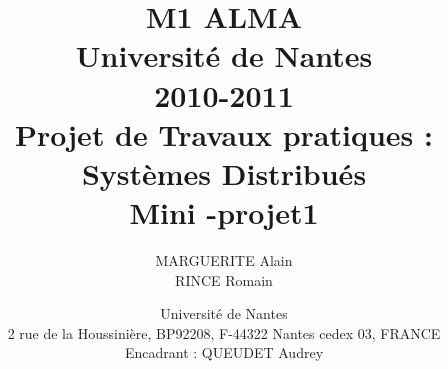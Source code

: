 \documentclass[12pt,a4paper,utf8x]{report}
\title
{
	\normalsize{ M1 ALMA\\ 
	Université de Nantes\\
	2010-2011}\\
	\vspace{15mm}
	\Huge{Projet de Travaux pratiques :\\Systèmes Distribués \\ Mini -projet1}
}
\author{MARGUERITE Alain\\ RINCE Romain
	\vspace{45mm}
}
\date
{	
	\normalsize{Université de Nantes \\ 2 rue de la Houssinière, BP92208, F-44322 Nantes cedex 03, FRANCE
	\\ 
	\vspace{5mm}	
	Encadrant : QUEUDET Audrey \\
	}
}
\begin{document}
\renewcommand{\labelitemi}{$\bullet$} 	
\maketitle


\clearpage

\tableofcontents
\clearpage

\begin{onehalfspace}






\end{onehalfspace}

\printglossary

\listoffigures

\printindex

\appendix



\end{document}
